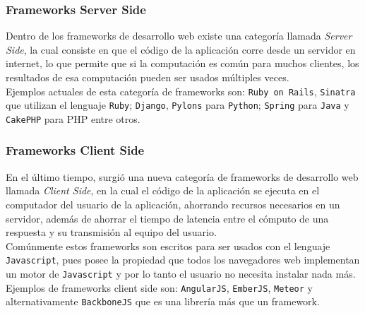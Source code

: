 \subsubsection{Frameworks Server Side} %
\label{ssub:frameworks_server_side}
Dentro de los frameworks de desarrollo web existe una categoría llamada \emph{Server Side}, la cual consiste en que el código de la aplicación corre desde un servidor en internet, lo que permite que si la computación es común para muchos clientes, los resultados de esa computación pueden ser usados múltiples veces.\\

Ejemplos actuales de esta categoría de frameworks son: \texttt{Ruby on Rails}\cite{rails}, \texttt{Sinatra}\cite{sinatra} que utilizan el lenguaje \texttt{Ruby}; \texttt{Django}\cite{django}, \texttt{Pylons}\cite{pylons} para \texttt{Python}; \texttt{Spring}\cite{spring} para \texttt{Java} y \texttt{CakePHP}\cite{cake} para PHP entre otros.

\subsubsection{Frameworks Client Side} %
\label{ssub:frameworks_client_side}
En el último tiempo, surgió una nueva categoría de frameworks de desarrollo web llamada \emph{Client Side}, en la cual el código de la aplicación se ejecuta en el computador del usuario de la aplicación, ahorrando recursos necesarios en un servidor, además de ahorrar el tiempo de latencia entre el cómputo de una respuesta y su transmisión al equipo del usuario.\\

Comúnmente estos frameworks son escritos para ser usados con el lenguaje \texttt{Javascript}, pues posee la propiedad que todos los navegadores web implementan un motor de \texttt{Javascript} y por lo tanto el usuario no necesita instalar nada más. Ejemplos de frameworks client side son: \texttt{AngularJS}\cite{angular}, \texttt{EmberJS}\cite{ember}, \texttt{Meteor}\cite{meteor} y alternativamente \texttt{BackboneJS}\cite{backbone} que es una librería más que un framework.


% 
% 
% 
